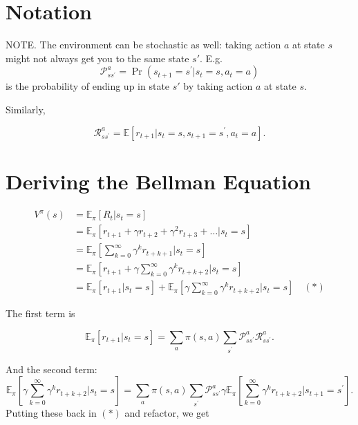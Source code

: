 \documentclass[10pt]{article}
\theoremstyle{plain}
\theoremstyle{definition}
\theoremstyle{remark}
\newcommand{\0}{\varnothing}
\newcommand{\<}{\langle}
\renewcommand{\>}{\rangle}
\begin{document}
\section{Notation}


NOTE. The environment can be stochastic as well: taking action \( a \) at state \( s \) might not always get you to the same state \( s'. \) E.g.
\[
\mathcal { P } _ { s s ^ { \prime } } ^ { a } = \operatorname { Pr } \left( s _ { t + 1 } = s ^ { \prime } | s _ { t } = s , a _ { t } = a \right)
\]
is the probability of ending up in state \( s' \) by taking action \( a \) at state \( s. \)

Similarly,

\[
\mathcal { R } _ { s s ^ { \prime } } ^ { a } = \mathbb { E } \left[ r _ { t + 1 } | s _ { t } = s , s _ { t + 1 } = s ^ { \prime } , a _ { t } = a \right].
\]

\section{Deriving the Bellman Equation}

\begin{align*}
V ^ { \pi } ( s ) &= \mathbb { E } _ { \pi } \left[ R _ { t } | s _ { t } = s \right] \\
&= \mathbb { E } _ { \pi } \left[ r _ { t + 1 } + \gamma r _ { t + 2 } + \gamma ^ { 2 } r _ { t + 3 } + \ldots | s _ { t } = s \right] \\
&= \mathbb { E } _ { \pi } \left[ \sum _ { k = 0 } ^ { \infty } \gamma ^ { k } r _ { t + k + 1 } \bigg| s _ { t } = s \right] \\
&= \mathbb { E } _ { \pi } \left[ r _ { t + 1 } + \gamma \sum _ { k = 0 } ^ { \infty } \gamma ^ { k } r _ { t + k + 2 } \bigg| s _ { t } = s \right] \\
&= \mathbb { E } _ { \pi } \left[ r _ { t + 1 } | s _ { t } = s \right] + \mathbb { E } _ { \pi } \left[ \gamma \sum _ { k = 0 } ^ { \infty } \gamma ^ { k } r _ { t + k + 2 } \bigg| s _ { t } = s \right] \quad (*)
\end{align*}

The first term is

\[
\mathbb { E } _ { \pi } \left[ r _ { t + 1 } | s _ { t } = s \right] = \sum _ { a } \pi ( s , a ) \sum _ { s ^ { \prime } } \mathcal { P } _ { s s ^ { \prime } } ^ { a } \mathcal { R } _ { s s ^ { \prime } } ^ { a }.
\]

And the second term:
\small
\[
\mathbb { E } _ { \pi } \left[ \gamma \sum _ { k = 0 } ^ { \infty } \gamma ^ { k } r _ { t + k + 2 } \bigg| s _ { t } = s \right] = \sum _ { a } \pi ( s , a ) \sum _ { s ^ { \prime } } \mathcal { P } _ { s s ^ { \prime } } ^ { a } \gamma \mathbb { E } _ { \pi } \left[ \sum _ { k = 0 } ^ { \infty } \gamma ^ { k } r _ { t + k + 2 } \bigg| s _ { t + 1 } = s ^ { \prime } \right].
\]
\normalsize
Putting these back in \( (*) \) and refactor, we get
\end{document}
